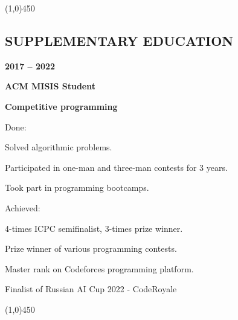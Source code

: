 \documentclass[a4paper,12pt,preview]{report}
\newcommand{\hr}{\begin{center} \line(1,0){450} \end{center}}
\begin{document}
\hr


\subsection*{SUPPLEMENTARY EDUCATION}

\begin{minipage}[c]{0.25\linewidth}
    \textbf{2017 – 2022} 
\end{minipage}
\begin{minipage}[c]{0.65\linewidth}
    \textbf{ACM MISIS Student}
    
    \textbf{Competitive programming}
\end{minipage}

\vspace{5mm} %

\begin{minipage}[c]{0.15\linewidth}
    Done:
\end{minipage}
\begin{minipage}[c]{0.75\linewidth}
	Solved algorithmic problems.
	
	Participated in one-man and three-man contests for 3 years.
	
	Took part in programming bootcamps.
\end{minipage}

\vspace{5mm} %

\begin{minipage}[c]{0.15\linewidth}
    Achieved:
\end{minipage}
\begin{minipage}[c]{0.75\linewidth}
	4-times ICPC semifinalist, 3-times prize winner.
	
	Prize winner of various programming contests.
	
	Master rank on Codeforces programming platform.
	
	Finalist of Russian AI Cup 2022 - CodeRoyale
\end{minipage}

\hr 
\end{document}
